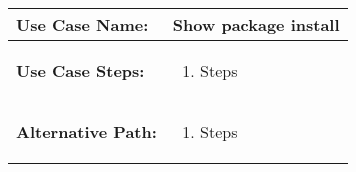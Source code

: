 \medskip

\begin{tabularx}{\linewidth}{|l|X|}
\hline
\textbf{Use Case Name:} & \textbf{Show package install} \\
\hline
\textbf{Use Case Steps:} & 
\begin{minipage}{\linewidth} 
  \vspace{0.05em}
  \begin{enumerate}
   \item Steps
  \end{enumerate}
  \vspace{0.05em}
\end{minipage}
\\
\hline 
\textbf{Alternative Path:} &
\begin{minipage}{\linewidth}
  \vspace{0.05em} 
  \begin{enumerate}
    \item Steps
  \end{enumerate}
  \vspace{0.05em} 
\end{minipage}
\\
\hline
\end{tabularx}

\newpage

